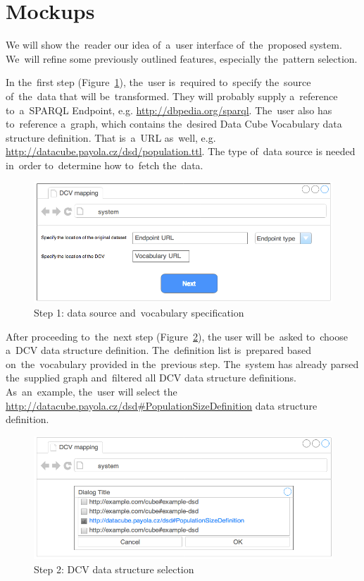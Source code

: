\section{Mockups}
\FloatBarrier
We will show the~reader our idea of~a~user interface of~the~proposed system. We~will refine some previously outlined features, especially the~pattern selection.

In the~first step (Figure~\ref{fig:mockup-01}), the~user is~required to~specify the~source of~the~data that 
will be~transformed. They will probably supply a~reference to~a~SPARQL Endpoint,
e.g. \url{http://dbpedia.org/sparql}. The~user also has to~reference a~graph, which contains the~desired Data Cube Vocabulary data structure definition.
That is~a~URL as~well, e.g. \url{http://datacube.payola.cz/dsd/population.ttl}.
The type of~data source 
is needed in~order to~determine how to~fetch the~data.
\begin{figure}
	\centering
	\includegraphics[width=120mm]{img/mockup-01.png}
	\caption{Step 1: data source and~vocabulary specification}
	\label{fig:mockup-01}
\end{figure}

After proceeding to~the~next step (Figure~\ref{fig:mockup-02}),
the user will be~asked to~choose a~DCV data 
structure definition. The~definition list is~prepared based on~the~vocabulary provided 
in the~previous step. The~system has already parsed the~supplied graph and~filtered all
DCV data structure definitions. As~an~example, the~user will select the
\url{http://datacube.payola.cz/dsd#PopulationSizeDefinition} data structure definition.

\begin{figure}
	\centering
	\includegraphics[width=120mm]{img/mockup-02.png}
	\caption{Step 2: DCV data structure selection}
	\label{fig:mockup-02}
\end{figure}

